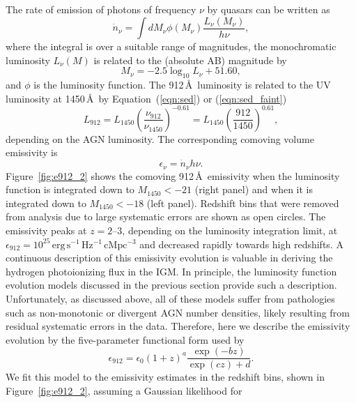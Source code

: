 \documentclass[fleqn,usenatbib]{mnras}
\begin{document}
The rate of emission of photons of frequency $\nu$ by quasars can be
written as
\begin{equation}
  \dot n_\nu = \int dM_\nu \phi(M_\nu) \frac{L_\nu(M_\nu)}{h\nu},
\end{equation}
where the integral is over a suitable range of magnitudes, the
monochromatic luminosity $L_\nu(M)$ is related to the (absolute AB)
magnitude by \citep{1983ApJ...266..713O}
\begin{equation}
  M_\nu = -2.5\log_{10}L_\nu+51.60,
\end{equation}
and $\phi$ is the luminosity function.  The 912\,\AA\ luminosity is
related to the UV luminosity at 1450\,\AA\ by Equation~(\ref{eqn:sed})
or (\ref{eqn:sed_faint})
\begin{equation}
  L_{912}=L_{1450}\left(\frac{\nu_{912}}{\nu_{1450}}\right)^{-0.61}=L_{1450}\left(\frac{912}{1450}\right)^{0.61},
\end{equation}
depending on the AGN luminosity.  The corresponding comoving volume
emissivity is
\begin{equation}
  \epsilon_\nu = \dot n_\nu h\nu.
  \label{eqn:epsilon}
\end{equation}
Figure~\ref{fig:e912_2} shows the comoving 912\,\AA\ emissivity when
the luminosity function is integrated down to $M_{1450}<-21$ (right
panel) and when it is integrated down to $M_{1450}<-18$ (left panel).
Redshift bins that were removed from analysis due to large systematic
errors are shown as open circles.  The emissivity peaks at $z=2$--$3$,
depending on the luminosity integration limit, at
$\epsilon_{912}=10^{25}\,\mathrm{erg\, s^{-1}\, Hz^{-1}\, cMpc^{-3}}$
and decreased rapidly towards high redshifts.  A continuous
description of this emissivity evolution is valuable in deriving the
hydrogen photoionizing flux in the IGM.  In principle, the luminosity
function evolution models discussed in the previous section provide
such a description.  Unfortunately, as discussed above, all of these
models suffer from pathologies such as non-monotonic or divergent AGN
number densities, likely resulting from residual systematic errors in
the data.  Therefore, here we describe the emissivity evolution by the
five-parameter functional form used by \citet{2012ApJ...746..125H}
\begin{equation}
  \epsilon_{912}=\epsilon_0(1+z)^a\frac{\exp(-bz)}{\exp(cz)+d}.
  \label{eqn:e912fit}
\end{equation}
We fit this model to the emissivity estimates in the redshift bins,
shown in Figure~\ref{fig:e912_2}, assuming a Gaussian likelihood for
\end{document}
